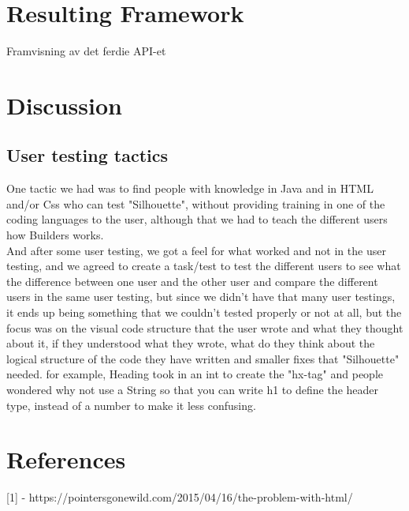 \documentclass[12pt]{article}
\begin{document}
\section{Resulting Framework}
Framvisning av det ferdie API-et

\section{Discussion}

    \subsection{User testing tactics}
    One tactic we had was to find people with knowledge in Java and in HTML and/or Css who can test "Silhouette", without providing training in one of the coding languages to the user, although that we had to teach the different users how Builders works. \\
    And after some user testing, we got a feel for what worked and not in the user testing, and we agreed to create a task/test to test the different users to see what the difference between one user and the other user and compare the different users in the same user testing, but since we didn't have that many user testings, it ends up being something that we couldn’t tested properly or not at all, but the focus was on the visual code structure that the user wrote and what they thought about it, if they understood what they wrote, what do they think about the logical structure of the code they have written and smaller fixes that "Silhouette" needed. for example, Heading took in an int to create the "hx-tag" and people wondered why not use a String so that you can write h1 to define the header type, instead of a number to make it less confusing.




\section{References}
[1] - https://pointersgonewild.com/2015/04/16/the-problem-with-html/
\end{document}
